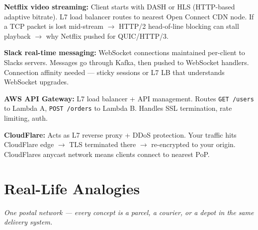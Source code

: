 \documentclass[11pt]{article}
\begin{document}
\textbf{Netflix video streaming:} Client starts with DASH or HLS (HTTP-based adaptive bitrate). L7 load balancer routes to nearest Open Connect CDN node. If a TCP packet is lost mid-stream \(\rightarrow\) HTTP/2 head-of-line blocking can stall playback \(\rightarrow\) why Netflix pushed for QUIC/HTTP/3.

\textbf{Slack real-time messaging:} WebSocket connections maintained per-client to Slack\textquotesingle s servers. Messages go through Kafka, then pushed to WebSocket handlers. Connection affinity needed --- sticky sessions or L7 LB that understands WebSocket upgrades.

\textbf{AWS API Gateway:} L7 load balancer + API management. Routes \texttt{GET\ /users} to Lambda A, \texttt{POST\ /orders} to Lambda B. Handles SSL termination, rate limiting, auth.

\textbf{CloudFlare:} Acts as L7 reverse proxy + DDoS protection. Your traffic hits CloudFlare edge \(\rightarrow\) TLS terminated there \(\rightarrow\) re-encrypted to your origin. CloudFlare\textquotesingle s anycast network means clients connect to nearest PoP.

\section{Real-Life Analogies}\label{real-life-analogies}

\emph{One postal network --- every concept is a parcel, a courier, or a depot in the same delivery system.}
\end{document}
